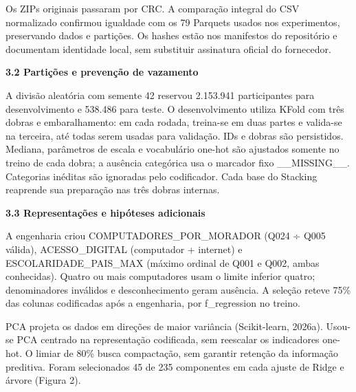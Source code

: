 \documentclass[12pt,a4paper]{article}
\newcommand{\heading}[1]{\par\Needspace{4\baselineskip}\noindent\textbf{#1}\par\vspace{5pt}}
\begin{document}
Os ZIPs originais passaram por CRC. A comparação integral do CSV normalizado confirmou igualdade com os 79 Parquets usados nos experimentos, preservando dados e partições. Os hashes estão nos manifestos do repositório e documentam identidade local, sem substituir assinatura oficial do fornecedor.


\heading{3.2 Partições e prevenção de vazamento}
A divisão aleatória com semente 42 reservou 2.153.941 participantes para desenvolvimento e 538.486 para teste. O desenvolvimento utiliza KFold com três dobras e embaralhamento: em cada rodada, treina-se em duas partes e valida-se na terceira, até todas serem usadas para validação. IDs e dobras são persistidos. Mediana, parâmetros de escala e vocabulário one-hot são ajustados somente no treino de cada dobra; a ausência categórica usa o marcador fixo \_\_MISSING\_\_. Categorias inéditas são ignoradas pelo codificador. Cada base do Stacking reaprende sua preparação nas três dobras internas.


\clearpage
\heading{3.3 Representações e hipóteses adicionais}
A engenharia criou COMPUTADORES\_POR\_MORADOR (Q024 ÷ Q005 válida), ACESSO\_DIGITAL (computador + internet) e ESCOLARIDADE\_PAIS\_MAX (máximo ordinal de Q001 e Q002, ambas conhecidas). Quatro ou mais computadores usam o limite inferior quatro; denominadores inválidos e desconhecimento geram ausência. A seleção reteve 75\% das colunas codificadas após a engenharia, por f\_regression no treino.


PCA projeta os dados em direções de maior variância (Scikit-learn, 2026a). Usou-se PCA centrado na representação codificada, sem reescalar os indicadores one-hot. O limiar de 80\% busca compactação, sem garantir retenção da informação preditiva. Foram selecionados 45 de 235 componentes em cada ajuste de Ridge e árvore (Figura 2).
\end{document}
